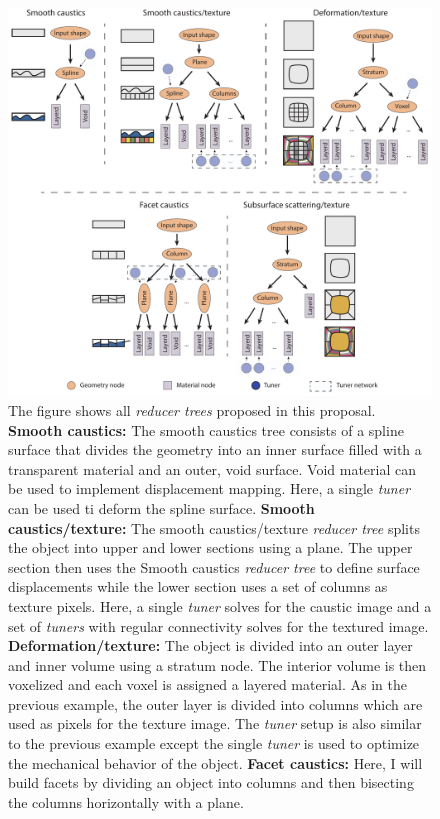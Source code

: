 \begin{figure}[t]
\centering
\includegraphics*[clip, width = \linewidth]{figure/ReducerNetworksSuplemental}
\caption{The figure shows all \emph{reducer trees} proposed in this proposal.
\textbf{Smooth caustics:} The smooth caustics tree consists of a spline surface that divides the geometry into an inner surface filled with a transparent material and an outer, void surface. Void material can be used to implement displacement mapping.
Here, a single \emph{tuner} can be used ti deform the spline surface.
\textbf{Smooth caustics/texture:} The smooth caustics/texture \emph{reducer tree} splits the object into upper and lower sections using a plane.
The upper section then uses the Smooth caustics \emph{reducer tree} to define surface displacements while the lower section uses a set of columns as texture pixels.
Here, a single \emph{tuner} solves for the caustic image and a set of \emph{tuners} with regular connectivity solves for the textured image.
\textbf{Deformation/texture:} The object is divided into an outer layer and inner volume using a stratum node.
The interior volume is then voxelized and each voxel is assigned a layered material.
As in the previous example, the outer layer is divided into columns which are used as pixels for the texture image.
The \emph{tuner} setup is also similar to the previous example except the single \emph{tuner} is used to optimize the mechanical behavior of the object.
\textbf{Facet caustics:} Here, I will build facets by dividing an object into columns and then bisecting the columns horizontally with a plane.
}
\end{figure}
